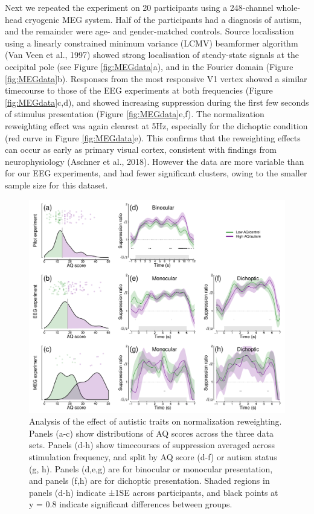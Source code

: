 \documentclass[
]{article}
\begin{document}
Next we repeated the experiment on 20 participants using a 248-channel whole-head cryogenic MEG system. Half of the participants had a diagnosis of autism, and the remainder were age- and gender-matched controls. Source localisation using a linearly constrained minimum variance (LCMV) beamformer algorithm (Van Veen et al., 1997) showed strong localisation of steady-state signals at the occipital pole (see Figure \ref{fig:MEGdata}a), and in the Fourier domain (Figure \ref{fig:MEGdata}b). Responses from the most responsive V1 vertex showed a similar timecourse to those of the EEG experiments at both frequencies (Figure \ref{fig:MEGdata}c,d), and showed increasing suppression during the first few seconds of stimulus presentation (Figure \ref{fig:MEGdata}e,f). The normalization reweighting effect was again clearest at 5Hz, especially for the dichoptic condition (red curve in Figure \ref{fig:MEGdata}e). This confirms that the reweighting effects can occur as early as primary visual cortex, consistent with findings from neurophysiology (Aschner et al., 2018). However the data are more variable than for our EEG experiments, and had fewer significant clusters, owing to the smaller sample size for this dataset.

\begin{figure}

{\centering \includegraphics{Figures/AQfigure} 

}

\caption{Analysis of the effect of autistic traits on normalization reweighting. Panels (a-c) show distributions of AQ scores across the three data sets. Panels (d-h) show timecourses of suppression averaged across stimulation frequency, and split by AQ score (d-f) or autism status (g, h). Panels (d,e,g) are for binocular or monocular presentation, and panels (f,h) are for dichoptic presentation. Shaded regions in panels (d-h) indicate ±1SE across participants, and black points at y = 0.8 indicate significant differences between groups.}\label{fig:AQanalysis}
\end{figure}
\end{document}
